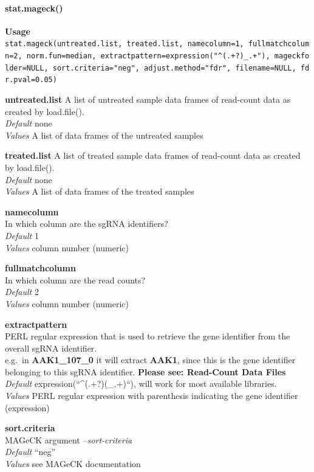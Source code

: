 \documentclass[]{article}
\let\oldparagraph\paragraph
\renewcommand{\paragraph}[1]{\oldparagraph{#1}\mbox{}}
\begin{document}
\paragraph{stat.mageck()}\label{stat.mageck}

\textbf{Usage}\\
\texttt{stat.mageck(untreated.list,\ treated.list,\ namecolumn=1,\ fullmatchcolumn=2,\ norm.fun=median,\ extractpattern=expression("\^{}(.+?)\_.+"),\ mageckfolder=NULL,\ sort.criteria="neg",\ adjust.method="fdr",\ filename=NULL,\ fdr.pval=0.05)}

\textbf{untreated.list} A list of untreated sample data frames of
read-count data as created by load.file().\\
\emph{Default} none\\
\emph{Values} A list of data frames of the untreated samples

\textbf{treated.list} A list of treated sample data frames of read-count
data as created by load.file().\\
\emph{Default} none\\
\emph{Values} A list of data frames of the treated samples

\textbf{namecolumn}\\
In which column are the sgRNA identifiers?\\
\emph{Default} 1\\
\emph{Values} column number (numeric)

\textbf{fullmatchcolumn}\\
In which column are the read counts?\\
\emph{Default} 2\\
\emph{Values} column number (numeric)

\textbf{extractpattern}\\
PERL regular expression that is used to retrieve the gene identifier
from the overall sgRNA identifier.\\
e.g.~in \textbf{AAK1\_107\_0} it will extract \textbf{AAK1}, since this
is the gene identifier belonging to this sgRNA identifier.
\textbf{Please see: Read-Count Data Files}\\
\emph{Default} expression(``\^{}(.+?)(\_.+)``), will work for most
available libraries.\\
\emph{Values} PERL regular expression with parenthesis indicating the
gene identifier (expression)

\textbf{sort.criteria}\\
MAGeCK argument \emph{--sort-criteria}\\
\emph{Default} ``neg''\\
\emph{Values} see MAGeCK documentation
\end{document}
